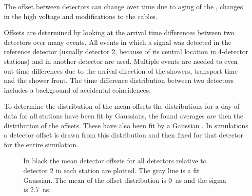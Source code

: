 The offset between detectors can change over time due to aging of the
\pmt, changes in the high voltage and modifications to the cables.

Offsets are determined by looking at the arrival time differences
between two detectors over many events. All events in which a signal was
detected in the reference detector (usually detector 2, because of its
central location in 4-detector stations) and in another detector are
used. Multiple events are needed to even out time differences due to the
arrival direction of the showers, transport time and the shower front.
The time difference distribution between two detectors includes a
background of accidental coincidences.

To determine the distribution of the mean offsets the distributions for
a day of data for all stations have been fit by Gaussians, the found
averages are then the distribution of the offsets. These have also been
fit by a Gaussian . In
simulations a detector offset is drawn from this distribution and then
fixed for that detector for the entire simulation.


\begin{figure}
    \centering
    
    \caption{ In black the mean
             detector offsets for all detectors relative to detector 2
             in each station are plotted. The gray line is a fit
             Gaussian. The mean of the offset distribution is
             \SI{0}{\nano\second} and the sigma is
             \SI{2.7}{\nano\second}.}
    \label{fig:detector_offset_distribution}
\end{figure}


